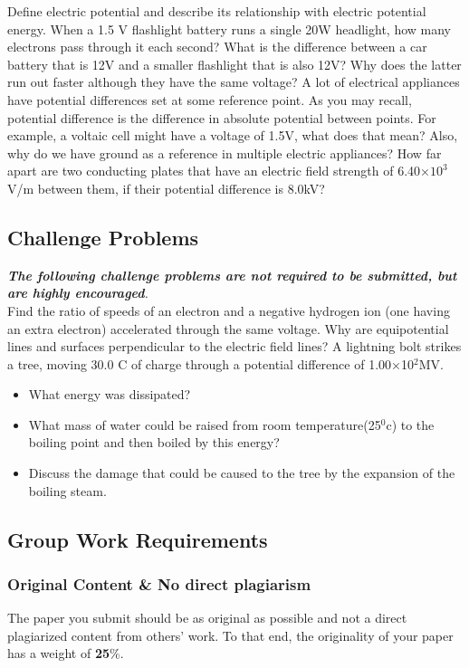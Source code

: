 \documentclass[9pt]{exam}
\begin{document}
	\begin{questions}
		\question Define electric potential and describe its relationship with electric potential energy.
		\question When a 1.5 V flashlight battery runs a single 20W headlight, how many electrons pass through it each second?
		\question What is the difference between a car battery that is 12V and a smaller flashlight that is also 12V? Why does the latter run out faster although they have the same voltage?
		\question A lot of electrical appliances have potential differences set at some reference point. As you may recall, potential difference is the difference in absolute potential between points. For example, a voltaic cell might have a voltage of 1.5V, what does that mean? Also, why do we have ground as a reference in multiple electric appliances?
		\question How far apart are two conducting plates that have an electric field strength of  6.40×$10^3$V/m  between them, if their potential difference is 8.0kV?		
		\subsection*{Challenge Problems}
		\textit{\textbf{The following challenge problems are not required to be submitted, but are highly encouraged}.} \\
		\question Find the ratio of speeds of an electron and a negative hydrogen ion (one having an extra electron) accelerated through the same voltage.
		\question Why are equipotential lines and surfaces perpendicular to the electric field lines?
		\question A lightning bolt strikes a tree, moving 30.0 C of charge through a potential difference of 1.00×10$^2$MV.\begin{itemize}
			\item What energy was dissipated?
			\item  What mass of water could be raised from  room temperature(25$^0$c) to the boiling point and then boiled by this energy?
			\item Discuss the damage that could be caused to the tree by the expansion of the boiling steam.
		\end{itemize} 
	\end{questions}		
		\begin{center}
		\subsection*{Group Work Requirements}
	\end{center}
	\subsubsection*{Original Content \& No direct plagiarism } 
	The paper you submit should be as original as possible and not a direct plagiarized content from others' work. To that end, the originality of your paper has a weight of \textbf{25}\%.
\end{document}
